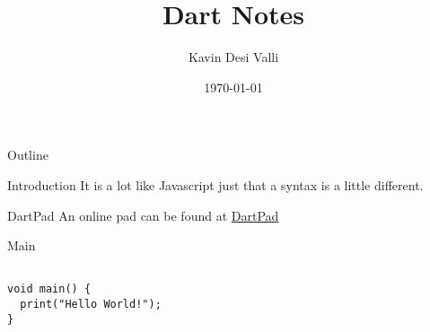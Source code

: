 \documentclass[presentation]{beamer}
\author{Kavin Desi Valli}
\date{\today}
\title{Dart Notes}
\begin{document}
\maketitle
\begin{frame}{Outline}
\tableofcontents
\end{frame}


\begin{frame}[label={sec:orgd901e37}]{Introduction}
It is a lot like Javascript just that a syntax is a little different.
\end{frame}

\begin{frame}[label={sec:orgaf6b74a}]{DartPad}
An online pad can be found at \href{https://dartpad.dev/}{DartPad}
\end{frame}

\begin{frame}[label={sec:orge856a76},fragile]{Main}
 \begin{verbatim}

void main() {
  print("Hello World!");
}

\end{verbatim}
\end{frame}
\end{document}
